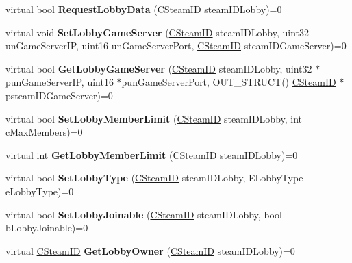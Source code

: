 \begin{DoxyCompactItemize}
virtual bool {\bfseries Request\+Lobby\+Data} (\hyperlink{class_c_steam_i_d}{C\+Steam\+ID} steam\+I\+D\+Lobby)=0
\item 
\mbox{\label{class_i_steam_matchmaking_a661394f63eb32200983d537e3d5c0053}} 
virtual void {\bfseries Set\+Lobby\+Game\+Server} (\hyperlink{class_c_steam_i_d}{C\+Steam\+ID} steam\+I\+D\+Lobby, uint32 un\+Game\+Server\+IP, uint16 un\+Game\+Server\+Port, \hyperlink{class_c_steam_i_d}{C\+Steam\+ID} steam\+I\+D\+Game\+Server)=0
\item 
\mbox{\label{class_i_steam_matchmaking_a07494e80748d60c2ff2e42b360c07037}} 
virtual bool {\bfseries Get\+Lobby\+Game\+Server} (\hyperlink{class_c_steam_i_d}{C\+Steam\+ID} steam\+I\+D\+Lobby, uint32 $\ast$pun\+Game\+Server\+IP, uint16 $\ast$pun\+Game\+Server\+Port, O\+U\+T\+\_\+\+S\+T\+R\+U\+CT() \hyperlink{class_c_steam_i_d}{C\+Steam\+ID} $\ast$psteam\+I\+D\+Game\+Server)=0
\item 
\mbox{\label{class_i_steam_matchmaking_a94cdc2b5934ac9d9ef1e46cff99567b6}} 
virtual bool {\bfseries Set\+Lobby\+Member\+Limit} (\hyperlink{class_c_steam_i_d}{C\+Steam\+ID} steam\+I\+D\+Lobby, int c\+Max\+Members)=0
\item 
\mbox{\label{class_i_steam_matchmaking_a3960497e79085ce68298e1ca4df3db8b}} 
virtual int {\bfseries Get\+Lobby\+Member\+Limit} (\hyperlink{class_c_steam_i_d}{C\+Steam\+ID} steam\+I\+D\+Lobby)=0
\item 
\mbox{\label{class_i_steam_matchmaking_a9d85958d0c5e4b297ddfc5e1002f7c71}} 
virtual bool {\bfseries Set\+Lobby\+Type} (\hyperlink{class_c_steam_i_d}{C\+Steam\+ID} steam\+I\+D\+Lobby, E\+Lobby\+Type e\+Lobby\+Type)=0
\item 
\mbox{\label{class_i_steam_matchmaking_a129730d6f22fa5846353eb6ef9b0884b}} 
virtual bool {\bfseries Set\+Lobby\+Joinable} (\hyperlink{class_c_steam_i_d}{C\+Steam\+ID} steam\+I\+D\+Lobby, bool b\+Lobby\+Joinable)=0
\item 
\mbox{\label{class_i_steam_matchmaking_a265ce1a6914a06cb686fd03c2cbca392}} 
virtual \hyperlink{class_c_steam_i_d}{C\+Steam\+ID} {\bfseries Get\+Lobby\+Owner} (\hyperlink{class_c_steam_i_d}{C\+Steam\+ID} steam\+I\+D\+Lobby)=0

\end{DoxyCompactItemize}
